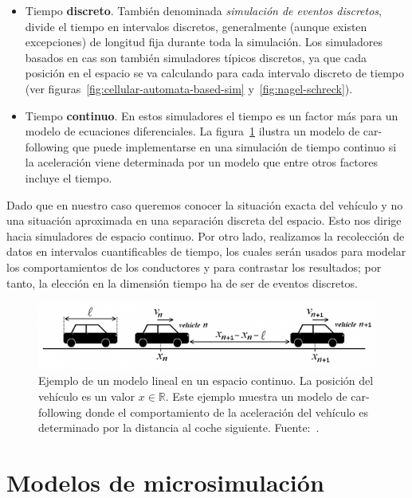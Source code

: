 \begin{itemize}
	\item Tiempo \textbf{discreto}. También denominada \textit{simulación de eventos discretos}, divide el tiempo en intervalos discretos, generalmente (aunque existen excepciones) de longitud fija durante toda la simulación. Los simuladores basados en \acp{ca} son también simuladores típicos discretos, ya que cada posición en el espacio se va calculando para cada intervalo discreto de tiempo (ver figuras~\ref{fig:cellular-automata-based-sim} y~\ref{fig:nagel-schreck}).
	\item Tiempo \textbf{continuo}. En estos simuladores el tiempo es un factor más para un modelo de ecuaciones diferenciales. La figura~\ref{fig:car-following-based-sim} ilustra un modelo de \gls{car-following} que puede implementarse en una simulación de tiempo continuo si la aceleración viene determinada por un modelo que entre otros factores incluye el tiempo.
\end{itemize}

Dado que en nuestro caso queremos conocer la situación exacta del vehículo y no una situación aproximada en una separación discreta del espacio. Esto nos dirige hacia simuladores de espacio continuo. Por otro lado, realizamos la recolección de datos en intervalos cuantificables de tiempo, los cuales serán usados para modelar los comportamientos de los conductores y para contrastar los resultados; por tanto, la elección en la dimensión tiempo ha de ser de eventos discretos.

\begin{figure}
	\centering
	\includegraphics{images/car-following-based-sim}
	\caption{Ejemplo de un modelo lineal en un espacio continuo. La posición del vehículo es un valor $x \in \mathbb{R}$. Este ejemplo muestra un modelo de \gls{car-following} donde el comportamiento de la aceleración del vehículo es determinado por la distancia al coche siguiente.  Fuente:~\cite{Tordeux2011}.}
	\label{fig:car-following-based-sim}
\end{figure}

\section{Modelos de microsimulación}

